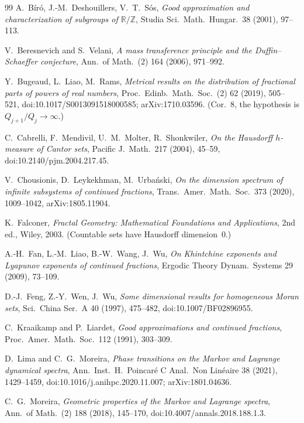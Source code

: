 \documentclass[11pt]{article}
\theoremstyle{definition}
\theoremstyle{remark}
\newcommand{\R}{\mathbb{R}}
\newcommand{\Z}{\mathbb{Z}}
\begin{document}
\begin{thebibliography}{99}
 A.~B\'ir\'o, J.-M.~Deshouillers, V.~T.~S\'os, \emph{Good
approximation and characterization of subgroups of $\R/\Z$}, Studia Sci.\ Math.\ Hungar.\ 38 (2001), 97--113.

 V.~Beresnevich and S.~Velani, \emph{A mass transference principle
and the Duffin--Schaeffer conjecture}, Ann.\ of Math.\ (2) 164 (2006), 971--992.

 Y.~Bugeaud, L.~Liao, M.~Rams, \emph{Metrical results on the
distribution of fractional parts of powers of real numbers}, Proc.\ Edinb.\ Math.\ Soc.\ (2) 62 (2019), 505--521, doi:10.1017/\allowbreak S0013091518000585; arXiv:1710.03596. (Cor.~8, the hypothesis is $Q_{j+1}/Q_j\to\infty$.)

 C.~Cabrelli, F.~Mendivil, U.~M.~Molter, R.~Shonkwiler,
\emph{On the Hausdorff $h$-measure of Cantor sets}, Pacific J.\ Math.\ 217
(2004), 45--59, doi:10.2140/\allowbreak pjm.2004.217.45.

 V.~Chousionis, D.~Leykekhman, M.~Urba\'nski, \emph{On the
dimension spectrum of infinite subsystems of continued fractions}, Trans.\ Amer.\ Math.\ Soc.\ 373 (2020), 1009--1042, arXiv:1805.11904.

 K.~Falconer, \emph{Fractal Geometry: Mathematical
Foundations and Applications}, 2nd ed., Wiley, 2003. (Countable sets have
Hausdorff dimension~$0$.)

 A.-H.~Fan, L.-M.~Liao, B.-W.~Wang, J.~Wu, \emph{On Khintchine
exponents and Lyapunov exponents of continued fractions}, Ergodic Theory Dynam.\ Systems 29 (2009), 73--109.

 D.-J.~Feng, Z.-Y.~Wen, J.~Wu, \emph{Some dimensional results
for homogeneous Moran sets}, Sci.\ China Ser.\ A 40 (1997), 475--482,
doi:10.1007/\allowbreak BF02896955.

 C.~Kraaikamp and P.~Liardet, \emph{Good approximations and
continued fractions}, Proc.\ Amer.\ Math.\ Soc.\ 112 (1991), 303--309.

 D.~Lima and C.~G.~Moreira, \emph{Phase transitions on
the Markov and Lagrange dynamical spectra}, Ann.\ Inst.\ H.~Poincar\'e
C Anal.\ Non Lin\'eaire 38 (2021), 1429--1459,
doi:10.1016/\allowbreak j.anihpc.2020.11.007; arXiv:1801.04636.

 C.~G.~Moreira, \emph{Geometric properties of the Markov and
Lagrange spectra}, Ann.\ of Math.\ (2) 188 (2018), 145--170,
doi:10.4007/\allowbreak annals.2018.188.1.3.


\end{thebibliography}
\end{document}
